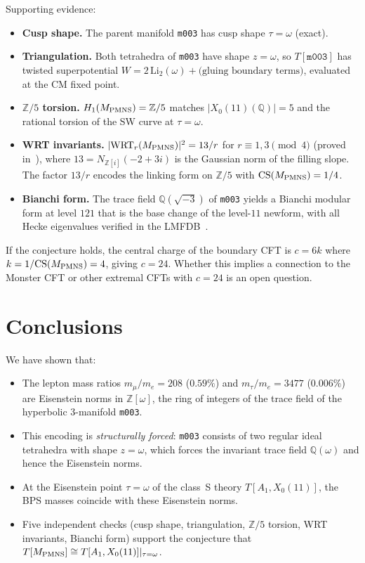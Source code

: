 \documentclass[11pt,a4paper]{article}
\theoremstyle{remark}
\newcommand{\mfld}[1]{\texttt{#1}}
\newcommand{\Z}{\mathbb{Z}}
\newcommand{\Q}{\mathbb{Q}}
\begin{document}
Supporting evidence:
\begin{itemize}
\item \textbf{Cusp shape.}
  The parent manifold \mfld{m003} has cusp shape $\tau=\omega$ (exact).
\item \textbf{Triangulation.}
  Both tetrahedra of \mfld{m003} have shape $z=\omega$,
  so $T[\mfld{m003}]$ has twisted superpotential
  $W=2\,\mathrm{Li}_2(\omega)+\text{(gluing boundary terms)}$,
  evaluated at the CM fixed point.
\item \textbf{$\Z/5$ torsion.}
  $H_1(M_{\rm PMNS})=\Z/5$ matches $|X_0(11)(\Q)|=5$
  and the rational torsion of the SW curve at $\tau=\omega$.
\item \textbf{WRT invariants.}
  $|\mathrm{WRT}_r(M_{\rm PMNS})|^2=13/r$ for $r\equiv1,3\pmod4$
  (proved in~\cite{GentryWRT}), where $13=N_{\Z[i]}(-2+3i)$ is the
  Gaussian norm of the filling slope.
  The factor $13/r$ encodes the linking form on $\Z/5$ with
  $\mathrm{CS}(M_{\rm PMNS})=1/4$.
\item \textbf{Bianchi form.}
  The trace field $\Q(\sqrt{-3})$ of \mfld{m003} yields a Bianchi
  modular form at level $121$ that is the base change of
  the level-$11$ newform, with all Hecke eigenvalues
  verified in the LMFDB~\cite{LMFDB}.
\end{itemize}

If the conjecture holds, the central charge of the boundary CFT is
$c=6k$ where $k=1/\mathrm{CS}(M_{\rm PMNS})=4$, giving $c=24$.
Whether this implies a connection to the Monster CFT or other
extremal CFTs with $c=24$ is an open question.

\section{Conclusions}
\label{sec:conclusion}

We have shown that:
\begin{itemize}
\item The lepton mass ratios $m_\mu/m_e=208$ ($0.59\%$) and
  $m_\tau/m_e=3477$ ($0.006\%$) are Eisenstein norms in $\Z[\omega]$,
  the ring of integers of the trace field of the hyperbolic 3-manifold
  \mfld{m003}.
\item This encoding is \emph{structurally forced}: \mfld{m003} consists
  of two regular ideal tetrahedra with shape $z=\omega$, which forces
  the invariant trace field $\Q(\omega)$ and hence the Eisenstein norms.
\item At the Eisenstein point $\tau=\omega$ of the class~S theory
  $T[A_1,X_0(11)]$, the BPS masses coincide with these Eisenstein norms.
\item Five independent checks (cusp shape, triangulation, $\Z/5$ torsion,
  WRT invariants, Bianchi form) support the conjecture that
  $T[M_{\rm PMNS}]\cong T[A_1,X_0(11)]|_{\tau=\omega}$.
\end{itemize}
\end{document}
